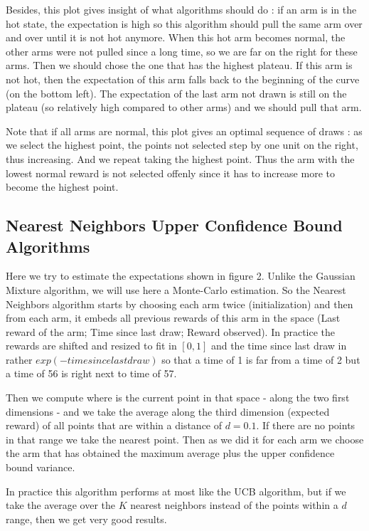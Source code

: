 \documentclass{article} %
\begin{document}
Besides, this plot gives insight of what algorithms should do : if an arm is in the hot state, the expectation is high so this algorithm should pull the same arm over and over until it is not hot anymore. When this hot arm becomes normal, the other arms were not pulled since a long time, so we are far on the right for these arms. Then we should chose the one that has the highest plateau. If this arm is not hot, then the expectation of this arm falls back to the beginning of the curve (on the bottom left). The expectation of the last arm not drawn is still on the plateau (so relatively high compared to other arms) and we should pull that arm.

Note that if all arms are normal, this plot gives an optimal sequence of draws : as we select the highest point, the points not selected step by one unit on the right, thus increasing. And we repeat taking the highest point. Thus the arm with the lowest normal reward is not selected offenly since it has to increase more to become the highest point.

\subsection{Nearest Neighbors Upper Confidence Bound Algorithms}

Here we try to estimate the expectations shown in figure 2. Unlike the Gaussian Mixture algorithm, we will use here a Monte-Carlo estimation. So the Nearest Neighbors algorithm starts by choosing each arm twice (initialization) and then from each arm, it embeds all previous rewards of this arm in the space (Last reward of the arm; Time since last draw; Reward observed). In practice the rewards are shifted and resized to fit in $[0,1]$ and the time since last draw in rather $exp(-time since last draw)$ so that a time of 1 is far from a time of 2 but a time of 56 is right next to time of 57.

Then we compute where is the current point in that space - along the two first dimensions - and we take the average along the third dimension (expected reward) of all points that are within a distance of $d=0.1$. If there are no points in that range we take the nearest point. Then as we did it for each arm we choose the arm that has obtained the maximum average plus the upper confidence bound variance.

In practice this algorithm performs at most like the UCB algorithm, but if we take the average over the $K$ nearest neighbors instead of the points within a $d$ range, then we get very good results.
\end{document}
